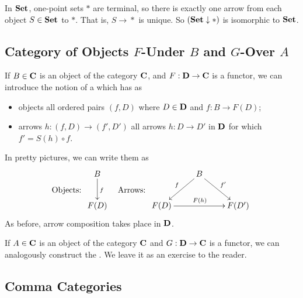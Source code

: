 \begin{ex}
In $\mathbf{Set}$, one-point sets $*$ are terminal, so there is
exactly one arrow from each object $S\in\mathbf{Set}$ to $*$. That
is, $S\to{}*$ is unique. So $(\mathbf{Set}\downarrow{}*)$ is
isomorphic to $\mathbf{Set}$.
\end{ex}

\subsection{Category of Objects $F$-Under $B$ and $G$-Over $A$}
If $B\in\mathbf{C}$ is an object of the category $\mathbf{C}$, and
$F:\mathbf{D}\to\mathbf{C}$ is a functor, we can introduce the notion of
a  which has as
\begin{itemize}
\item objects all ordered pairs $(f,D)$ where $D\in\mathbf{D}$ and $f:B\to{}F(D)$;
\item arrows $h:(f,D)\to{}(f',D')$ all arrows $h:D\to{}D'$ in
  $\mathbf{D}$ for which $f'=S(h)\circ{}f$.
\end{itemize}
In pretty pictures, we can write them as
\begin{equation}%
\text{Objects: }\vcenter{\xymatrix{
B\ar[d]^{f}\\
F(D)
}}\quad
\text{Arrows: }
\vcenter{\xymatrix{
& \ar[dl]_{f}B\ar[dr]^{f'}&\\
F(D)\ar[rr]^{F(h)}&&F(D')
}}
\end{equation}
As before, arrow composition takes place in $\mathbf{D}$.

If $A\in\mathbf{C}$ is an object of the category $\mathbf{C}$ and
$G:\mathbf{D}\to\mathbf{C}$ is a functor, we can analogously construct
the . We leave it as an
exercise to the reader.

\subsection{Comma Categories}

